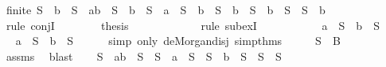 \begin{isabellebody}
\ {\isachardoublequoteopen}finite\ {\isacharparenleft}S\ {\isacharminus}\ {\isacharbraceleft}b{\isacharbraceright}{\isacharparenright}\ {\isasymand}\ {\isacharparenleft}S\ {\isacharequal}\ {\isacharbraceleft}a{\isacharcomma}b{\isacharbraceright}\ {\isasymunion}\ {\isacharparenleft}S\ {\isacharminus}\ {\isacharbraceleft}b{\isacharbraceright}{\isacharparenright}\ {\isasymor}\ S\ {\isacharequal}\ {\isacharbraceleft}a{\isacharbraceright}\ {\isasymunion}\ {\isacharparenleft}S\ {\isacharminus}\ {\isacharbraceleft}b{\isacharbraceright}{\isacharparenright}\ {\isasymor}\ S\ {\isacharequal}\ {\isacharbraceleft}b{\isacharbraceright}\ {\isasymunion}\ {\isacharparenleft}S\ {\isacharminus}\ {\isacharbraceleft}b{\isacharbraceright}{\isacharparenright}\ {\isasymor}\ S\ {\isacharequal}\ {\isacharparenleft}S\ {\isacharminus}\ {\isacharbraceleft}b{\isacharbraceright}{\isacharparenright}{\isacharparenright}{\isachardoublequoteclose}\isanewline
\ \ \ \ \ \ \ \ \isamarkupfalse%
\ {}\ \isamarkupfalse%
\ {\isacharparenleft}rule\ conjI{\isacharparenright}\isanewline
\ \ \ \ \ \ \isamarkupfalse%
\ {\isacharquery}thesis\isanewline
\ \ \ \ \ \ \ \ \isamarkupfalse%
\ {}\ \isamarkupfalse%
\ {\isacharparenleft}rule\ subexI{\isacharparenright}\isanewline
\ \ \ \ \isamarkupfalse%
\isanewline
\ \ \isamarkupfalse%
\isanewline
{}\isamarkupfalse%
\isanewline
\ \ \isamarkupfalse%
\ {\isachardoublequoteopen}{\isasymnot}{\isacharparenleft}a\ {\isasymin}\ S\ {\isasymor}\ b\ {\isasymin}\ S{\isacharparenright}{\isachardoublequoteclose}\isanewline
\ \ \isamarkupfalse%
\ \isamarkupfalse%
\ {\isachardoublequoteopen}a\ {\isasymnotin}\ S\ {\isasymand}\ b\ {\isasymnotin}\ S{\isachardoublequoteclose}\isanewline
\ \ \ \ \isamarkupfalse%
\ {\isacharparenleft}simp\ only{\isacharcolon}\ de{\isacharunderscore}Morgan{\isacharunderscore}disj\ simp{\isacharunderscore}thms{\isacharparenleft}{}{\isacharparenright}{\isacharparenright}\isanewline
\ \ \isamarkupfalse%
\ \isamarkupfalse%
\ {}{\isacharcolon}{\isachardoublequoteopen}S\ {\isasymsubseteq}\ B{\isachardoublequoteclose}\isanewline
\ \ \ \ \isamarkupfalse%
\ assms{\isacharparenleft}{}{\isacharparenright}\ \isamarkupfalse%
\ blast\isanewline
\ \ \isamarkupfalse%
\ {}{\isacharcolon}{\isachardoublequoteopen}S\ {\isacharequal}\ {\isacharbraceleft}a{\isacharcomma}b{\isacharbraceright}\ {\isasymunion}\ S\ {\isasymor}\ S\ {\isacharequal}\ {\isacharbraceleft}a{\isacharbraceright}\ {\isasymunion}\ S\ {\isasymor}\ S\ {\isacharequal}\ {\isacharbraceleft}b{\isacharbraceright}\ {\isasymunion}\ S\ {\isasymor}\ S\ {\isacharequal}\ S{\isachardoublequoteclose}\isanewline

\end{isabellebody}
